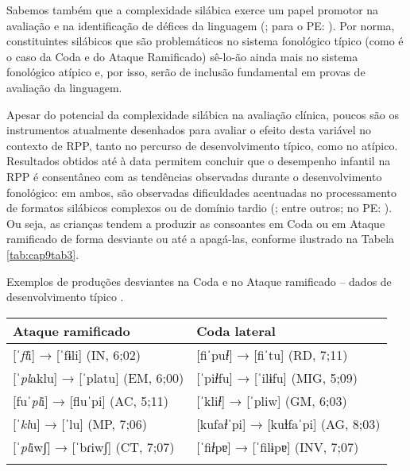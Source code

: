\documentclass[output=paper,colorlinks,citecolor=brown,booklanguage=portuguese]{langscibook}
\begin{document}
Sabemos também que a complexidade silábica exerce um papel promotor na avaliação e na identificação de défices da linguagem (\citealp{Gallon2007, Ferre2015a, Marshall2009}; para o PE: \citealp{Lousada2012a, Ramalho2017}). Por norma, constituintes silábicos que são problemáticos no sistema fonológico típico (como é o caso da Coda e do Ataque Ramificado) sê-lo-ão ainda mais no sistema fonológico atípico e, por isso, serão de inclusão fundamental em provas de avaliação da linguagem.

Apesar do potencial da complexidade silábica na avaliação clínica, poucos são os instrumentos atualmente desenhados para avaliar o efeito desta variável no contexto de RPP, tanto no percurso de desenvolvimento típico, como no atípico. Resultados obtidos até à data permitem concluir que o desempenho infantil na RPP é consentâneo com as tendências observadas durante o desenvolvimento fonológico: em ambos, são observadas dificuldades acentuadas no processamento de formatos silábicos complexos ou de domínio tardio (\citealp{Almeida2019, Briscoe2001, Gallon2007, Marshall2009}; entre outros; no PE: \citealp{Catarino2019}). Ou seja, as crianças tendem a produzir as consoantes em Coda ou em Ataque ramificado de forma desviante ou até a apagá-las, conforme ilustrado na Tabela \ref{tab:cap9tab3}.



\begin{Tabela}
\caption{Exemplos de produções desviantes na Coda e no Ataque ramificado -- dados de desenvolvimento típico \citep{Catarino2019}.}
\label{tab:cap9tab3}


\begin{tabularx}{\textwidth}{Xl}
\lsptoprule
Ataque ramificado&	Coda lateral \\
\midrule
{[ˈ\emph{fl}i] → [ˈfɨli]} (IN, 6;02) & {[fiˈpu\emph{ɫ}] → [fiˈtu]}  (RD, 7;11) \\  \relax
{[ˈ\emph{pl}aklu] → [ˈplatu]} (EM, 6;00)&{[ˈpi\emph{ɫ}fu] → [ˈilɨfu]}  (MIG, 5;09)\\  \relax
{[fuˈ\emph{pl}i] → [fluˈpi]} (AC, 5;11)& {[ˈkli\emph{ɫ}] → [ˈpliw]} (GM, 6;03)\\  \relax
{[ˈ\emph{kl}u] → [ˈlu]} (MP, 7;06)& {[kufa\emph{ɫ}ˈpi] → [kuɫfaˈpi]} (AG, 8;03)\\  \relax
{[ˈ\emph{pl}iwʃ] → [ˈbɾiwʃ]} (CT, 7;07)& {[ˈfi\emph{ɫ}pɐ] → [ˈfilɨpɐ]} (INV, 7;07)\\
\lspbottomrule
\end{tabularx}
\end{Tabela}
\end{document}
